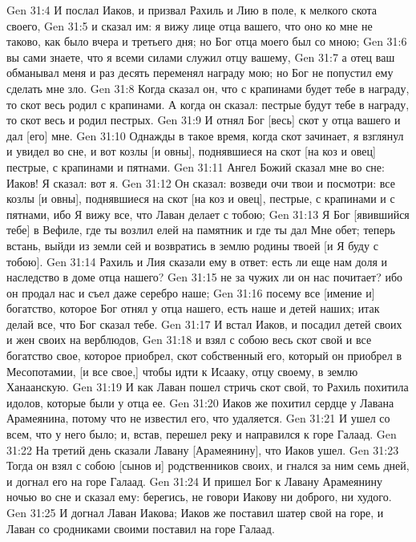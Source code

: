 \vs Gen 31:4 И послал Иаков, и призвал Рахиль и Лию в поле, к  мелкого скота своего,
\vs Gen 31:5 и сказал им: я вижу лице отца вашего, что оно ко мне не таково, как было вчера и третьего дня; но Бог отца моего был со мною;
\vs Gen 31:6 вы сами знаете, что я всеми силами служил отцу вашему,
\vs Gen 31:7 а отец ваш обманывал меня и раз десять переменял награду мою; но Бог не попустил ему сделать мне зло.
\vs Gen 31:8 Когда сказал он, что  с крапинами будет тебе в награду, то скот весь родил с крапинами. А когда он сказал: пестрые будут тебе в награду, то скот весь и родил пестрых.
\vs Gen 31:9 И отнял Бог [весь] скот у отца вашего и дал [его] мне.
\vs Gen 31:10 Однажды в такое время, когда скот зачинает, я взглянул и увидел во сне, и вот козлы [и овны], поднявшиеся на скот [на коз и овец] пестрые, с крапинами и пятнами.
\vs Gen 31:11 Ангел Божий сказал мне во сне: Иаков! Я сказал: вот я.
\vs Gen 31:12 Он сказал: возведи очи твои и посмотри: все козлы [и овны], поднявшиеся на скот [на коз и овец], пестрые, с крапинами и с пятнами, ибо Я вижу все, что Лаван делает с тобою;
\vs Gen 31:13 Я Бог [явившийся тебе] в Вефиле, где ты возлил елей на памятник и где ты дал Мне обет; теперь встань, выйди из земли сей и возвратись в землю родины твоей [и Я буду с тобою].
\vs Gen 31:14 Рахиль и Лия сказали ему в ответ: есть ли еще нам доля и наследство в доме отца нашего?
\vs Gen 31:15 не за чужих ли он нас почитает? ибо он продал нас и съел даже серебро наше;
\vs Gen 31:16 посему все [имение и] богатство, которое Бог отнял у отца нашего, есть наше и детей наших; итак делай все, что Бог сказал тебе.
\rsbpar\vs Gen 31:17 И встал Иаков, и посадил детей своих и жен своих на верблюдов,
\vs Gen 31:18 и взял с собою весь скот свой и все богатство свое, которое приобрел, скот собственный его, который он приобрел в Месопотамии, [и все свое,] чтобы идти к Исааку, отцу своему, в землю Ханаанскую.
\vs Gen 31:19 И как Лаван пошел стричь скот свой, то Рахиль похитила идолов, которые были у отца ее.
\vs Gen 31:20 Иаков же похитил сердце у Лавана Арамеянина, потому что не известил его, что удаляется.
\vs Gen 31:21 И ушел со всем, что у него было; и, встав, перешел реку и направился к горе Галаад.
\vs Gen 31:22 На третий день сказали Лавану [Арамеянину], что Иаков ушел.
\vs Gen 31:23 Тогда он взял с собою [сынов и] родственников своих, и гнался за ним семь дней, и догнал его на горе Галаад.
\vs Gen 31:24 И пришел Бог к Лавану Арамеянину ночью во сне и сказал ему: берегись, не говори Иакову ни доброго, ни худого.
\vs Gen 31:25 И догнал Лаван Иакова; Иаков же поставил шатер свой на горе, и Лаван со сродниками своими поставил на горе Галаад.
